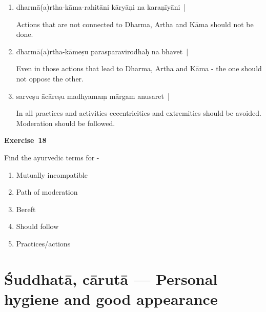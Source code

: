 \begin{enumerate}
\itemsep=0pt
\item {}

dharmā(a)rtha-kāma-rahitāni kāryāṇi na karaṇīyāni~|

Actions that are not connected to Dharma, Artha and Kāma should not be done. 

\item {}

dharmā(a)rtha-kāmeṣu parasparavirodhaḥ na bhavet~| 

Even in those actions that lead to Dharma, Artha and Kāma - the one should not oppose the other. 

\item {}

sarveṣu ācāreṣu madhyamaṃ mārgam anusaret~| 

In all practices and activities eccentricities and extremities should be avoided. Moderation should be followed.
\end{enumerate}

\centerline{\textbf{Exercise~18}}

Find the āyurvedic terms for -
\begin{enumerate}
\itemsep=0pt
\renewcommand{\theenumi}{\alph{enumi}}
\renewcommand{\labelenumi}{\theenumi.}
\item Mutually incompatible
\item Path of moderation 
\item Bereft
\item Should follow 
\item Practices/actions
\end{enumerate}

\chapter{Śuddhatā, cārutā --- Personal hygiene and  good appearance}

